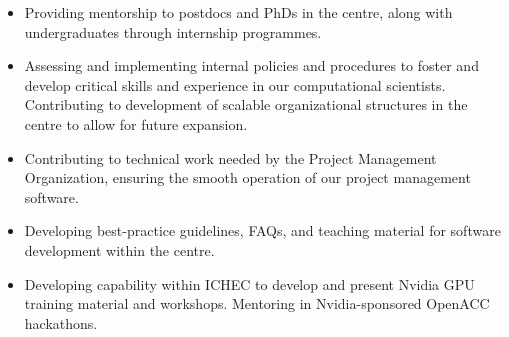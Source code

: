 \documentclass[11pt]{article}
\newenvironment{resumeSubSectionBody}{
    \par
    \vspace{-0.4\parskip}
    \begin{small}
    \par
} {
    \par
    \end{small}
    \par
}
\newenvironment{resumeItemize}{
    \vspace{-0.5\baselineskip}
    \begin{itemize}
} {
    \end{itemize}
}
\begin{document}
\begin{resumeSubSectionBody}
\begin{resumeItemize}
        \item
            Providing mentorship to postdocs and PhDs in the centre, along with
            undergraduates through internship programmes.

        \item
            Assessing and implementing internal policies and procedures to
            foster and develop critical skills and experience in our
            computational scientists.
            Contributing to development of scalable organizational structures in
            the centre to allow for future expansion.

        \item
            Contributing to technical work needed by the Project Management
            Organization, ensuring the smooth operation of our project
            management software.

        \item
            Developing best-practice guidelines, FAQs, and teaching material for
            software development within the centre.

        \item
            Developing capability within ICHEC to develop and present Nvidia GPU
            training material and workshops.
            Mentoring in Nvidia-sponsored OpenACC hackathons.
    \end{resumeItemize}
\end{resumeSubSectionBody}
\end{document}

